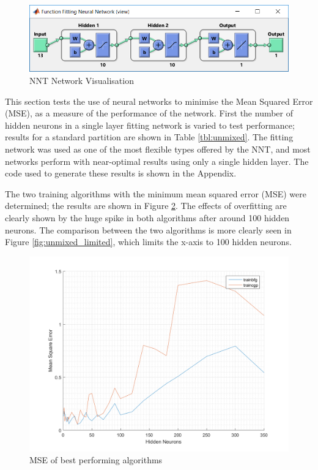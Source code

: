 \documentclass[a4paper, 10pt, conference]{ieeeconf}
\begin{document}
\begin{figure}[!ht]
    \centering
    \includegraphics[width=\linewidth]{pic/view_twolayer}
    \caption{NNT Network Visualisation}
    \label{fig:nnt_vis}
\end{figure}

This section tests the use of neural networks to minimise the Mean Squared Error (MSE), as a measure of the performance of the network. First the number of hidden neurons in a single layer fitting network is varied to test performance; results for a standard partition are shown in Table \ref{tbl:unmixed}. The fitting network was used as one of the most flexible types offered by the NNT, and most networks perform with near-optimal results using only a single hidden layer. The code used to generate these results is shown in the Appendix.

The two training algorithms with the minimum mean squared error (MSE) were determined; the results are shown in Figure \ref{fig:unmixed_full}. The effects of overfitting are clearly shown by the huge spike in both algorithms after around 100 hidden neurons. The comparison between the two algorithms is more clearly seen in Figure \ref{fig:unmixed_limited}, which limits the x-axis to 100 hidden neurons.

\begin{figure}[!ht]
    \centering
    \includegraphics[width=\linewidth]{pic/unmixed_best_fullrange.png}
    \caption{MSE of best performing algorithms}
    \label{fig:unmixed_full}
\end{figure}
\end{document}
